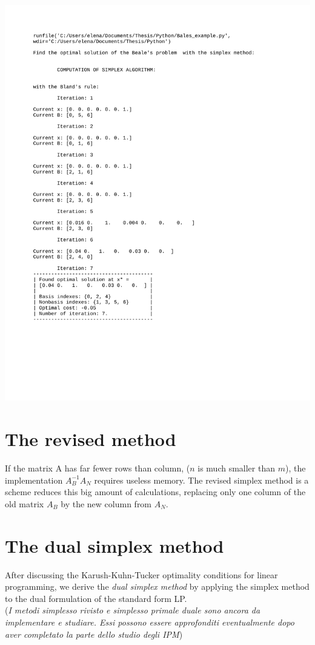 \documentclass[a4paper,10 pt,titlepage,twoside]{book}
\theoremstyle{plain}
\theoremstyle{definition}
\theoremstyle{remark}
\begin{document}
\includegraphics[page = 3]{Balesexample.pdf}

\section{The revised method}
If the matrix A has far fewer rows than column, ($n$ is much smaller than $m$), the implementation $A_{B}^{-1}A_{N}$ requires useless memory. The revised simplex method is a scheme reduces this big amount of calculations, replacing only one column of the old matrix $A_{B}$ by the new column from $A_{N}$.\\

 \section{The dual simplex method}
After discussing the Karush-Kuhn-Tucker optimality conditions for linear programming, we derive the \textit{dual simplex method} by applying the simplex method to the dual formulation of the standard form LP. 
\\
(\textit{I metodi simplesso rivisto e simplesso primale duale sono ancora da implementare e studiare. Essi possono essere approfonditi eventualmente dopo aver completato la parte dello studio degli IPM})
\end{document}
